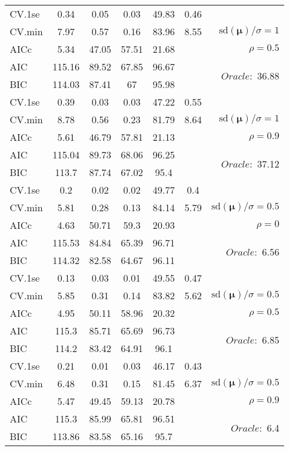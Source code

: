 \begin{table}
\begin{center}
\begin{tabular}{l*{5}{c}|r}
 \hline 
CV.1se & 0.34 & 0.05 & 0.03 & 49.83 & 0.46 & \\
CV.min & 7.97 & 0.57 & 0.16 & 83.96 & 8.55 &  $\mathrm{sd}(\mathbf{\mu})/\sigma=1$ \\
AICc & 5.34 & 47.05 & 57.51 & 21.68 & & $\rho=0.5$ \\
AIC & 115.16 & 89.52 & 67.85 & 96.67 & &  \multirow{2}{*}{$Oracle: $ 36.88} \\
BIC & 114.03 & 87.41 & 67 & 95.98 & &  \\
 \hline 
CV.1se & 0.39 & 0.03 & 0.03 & 47.22 & 0.55 & \\
CV.min & 8.78 & 0.56 & 0.23 & 81.79 & 8.64 &  $\mathrm{sd}(\mathbf{\mu})/\sigma=1$ \\
AICc & 5.61 & 46.79 & 57.81 & 21.13 & & $\rho=0.9$ \\
AIC & 115.04 & 89.73 & 68.06 & 96.25 & &  \multirow{2}{*}{$Oracle: $ 37.12} \\
BIC & 113.7 & 87.74 & 67.02 & 95.4 & &  \\
 \hline 
CV.1se & 0.2 & 0.02 & 0.02 & 49.77 & 0.4 & \\
CV.min & 5.81 & 0.28 & 0.13 & 84.14 & 5.79 &  $\mathrm{sd}(\mathbf{\mu})/\sigma=0.5$ \\
AICc & 4.63 & 50.71 & 59.3 & 20.93 & & $\rho=0$ \\
AIC & 115.53 & 84.84 & 65.39 & 96.71 & &  \multirow{2}{*}{$Oracle: $ 6.56} \\
BIC & 114.32 & 82.58 & 64.67 & 96.11 & &  \\
 \hline 
CV.1se & 0.13 & 0.03 & 0.01 & 49.55 & 0.47 & \\
CV.min & 5.85 & 0.31 & 0.14 & 83.82 & 5.62 &  $\mathrm{sd}(\mathbf{\mu})/\sigma=0.5$ \\
AICc & 4.95 & 50.11 & 58.96 & 20.32 & & $\rho=0.5$ \\
AIC & 115.3 & 85.71 & 65.69 & 96.73 & &  \multirow{2}{*}{$Oracle: $ 6.85} \\
BIC & 114.2 & 83.42 & 64.91 & 96.1 & &  \\
 \hline 
CV.1se & 0.21 & 0.01 & 0.03 & 46.17 & 0.43 & \\
CV.min & 6.48 & 0.31 & 0.15 & 81.45 & 6.37 &  $\mathrm{sd}(\mathbf{\mu})/\sigma=0.5$ \\
AICc & 5.47 & 49.45 & 59.13 & 20.78 & & $\rho=0.9$ \\
AIC & 115.3 & 85.99 & 65.81 & 96.51 & &  \multirow{2}{*}{$Oracle: $ 6.4} \\
BIC & 113.86 & 83.58 & 65.16 & 95.7 & &  \\
 \hline 
\end{tabular}
\end{center}
\vspace{-1cm}
\end{table}




